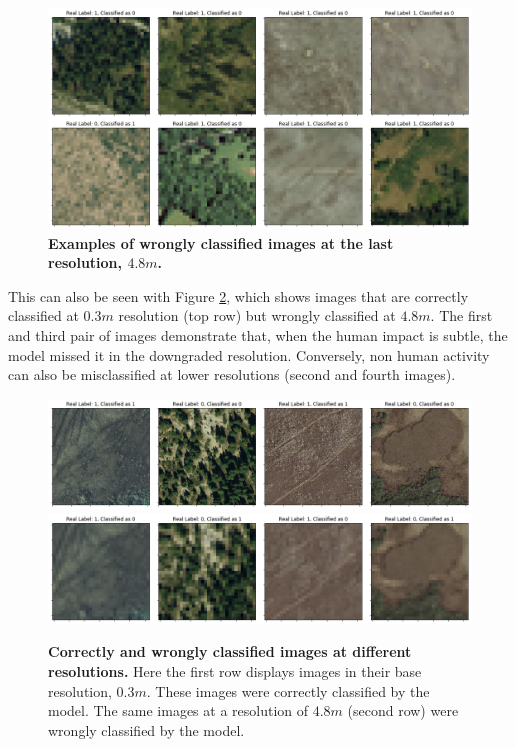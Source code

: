 \begin{figure}[H]
	\centering
	\captionsetup{width=1\linewidth}
	\includegraphics[width=1\textwidth]{Figures/results/class_dataset03m_res48_wrong.png}
	\caption{\textbf{Examples of wrongly classified images at the last resolution, $4.8m$.}}
	\label{fig:dataset03m_res48_wrong}
\end{figure}

This can also be seen with Figure \ref{fig:dataset03m_res03_res48_comp}, which shows images that are correctly classified at $0.3m$ resolution (top row) but wrongly classified at $4.8m$. The first and third pair of images demonstrate that, when the human impact is subtle, the model missed it in the downgraded resolution. Conversely, non human activity can also be misclassified at lower resolutions (second and fourth images).

\begin{figure}[H]
	\centering
	\captionsetup{width=1\linewidth}
	\includegraphics[width=1\textwidth]{Figures/results/class_dataset03m_res03_comp_correct.png}
	\includegraphics[width=1\textwidth]{Figures/results/class_dataset03m_res48_comp_wrong.png}
	\caption{\textbf{Correctly and wrongly classified images at different resolutions.} Here the first row displays images in their base resolution, $0.3m$. These images were correctly classified by the model. The same images at a resolution of $4.8m$ (second row) were wrongly classified by the model.}
	\label{fig:dataset03m_res03_res48_comp}
\end{figure}

